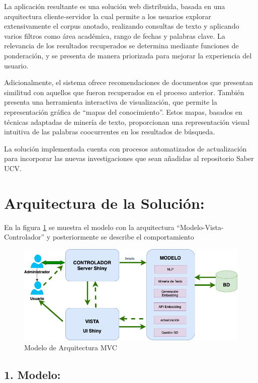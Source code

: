 \documentclass[
  10,
  openany]{book}
\begin{document}
La aplicación resultante es una solución web distribuida, basada en una arquitectura cliente-servidor la cual permite a los usuarios explorar extensivamente el corpus anotado, realizando consultas de texto y aplicando varios filtros como área académica, rango de fechas y palabras clave. La relevancia de los resultados recuperados se determina mediante funciones de ponderación, y se presenta de manera priorizada para mejorar la experiencia del usuario.

Adicionalmente, el sistema ofrece recomendaciones de documentos que presentan similitud con aquellos que fueron recuperados en el proceso anterior. También presenta una herramienta interactiva de visualización, que permite la representación gráfica de ``mapas del conocimiento''. Estos mapas, basados en técnicas adaptadas de minería de texto, proporcionan una representación visual intuitiva de las palabras coocurrentes en los resultados de búsqueda.

La solución implementada cuenta con procesos automatizados de actualización para incorporar las nuevas investigaciones que sean añadidas al repositorio Saber UCV.

\hypertarget{desarrolloarquitectura}{%
\section{Arquitectura de la Solución:}\label{desarrolloarquitectura}}

En la figura \ref{fig:arquitecturamvc} se muestra el modelo con la arquitectura ``Modelo-Vista-Controlador'' y posteriormente se describe el comportamiento

\begin{figure}

{\centering \includegraphics[width=0.8\linewidth]{images/05-desarrollo/MVC3} 

}

\caption{Modelo de Arquitectura MVC}\label{fig:arquitecturamvc}
\end{figure}

\hypertarget{modelo}{%
\subsection{\texorpdfstring{\textbf{1. Modelo:}}{1. Modelo:}}\label{modelo}}
\end{document}
